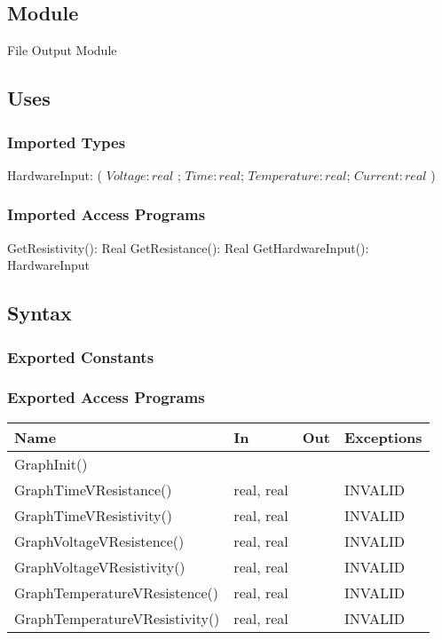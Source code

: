 \documentclass[12pt, titlepage]{article}
\begin{document}
\subsection{Module}

File Output Module

\subsection{Uses}

\subsubsection{Imported Types}

HardwareInput: ( $Voltage: real $ ; $Time: real$; $Temperature: real$; $Current: real$ )\\

\subsubsection{Imported Access Programs}

  GetResistivity(): Real
  GetResistance(): Real
  GetHardwareInput(): HardwareInput

\subsection{Syntax}

\subsubsection{Exported Constants}

\subsubsection{Exported Access Programs}

\begin{center}
\begin{tabular}{p{6cm} p{2cm} p{2cm} p{3cm}}
\hline
\textbf{Name} & \textbf{In} & \textbf{Out} & \textbf{Exceptions} \\
\hline
GraphInit() & &  &  \\
GraphTimeVResistance() & real, real &  & INVALID \\
GraphTimeVResistivity() & real, real &  & INVALID \\
GraphVoltageVResistence() & real, real &  & INVALID \\
GraphVoltageVResistivity() & real, real &  & INVALID \\
GraphTemperatureVResistence() & real, real &  & INVALID \\
GraphTemperatureVResistivity() & real, real &  & INVALID \\
\hline
\end{tabular}
\end{center}
\end{document}

